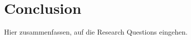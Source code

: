 \chapter{Conclusion}
\label{cha:conclusion}

Hier zusammenfassen, auf die Research Questions eingehen.